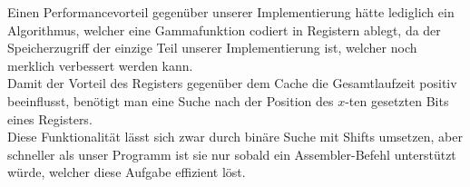 \documentclass[course=erap]{aspdoc}
\begin{document}
	\noindent Einen Performancevorteil gegenüber unserer Implementierung hätte lediglich ein Algorithmus, welcher eine Gammafunktion codiert in Registern ablegt, da der Speicherzugriff der einzige Teil unserer Implementierung ist, welcher noch merklich verbessert werden kann.\\
	Damit der Vorteil des Registers gegenüber dem Cache die Gesamtlaufzeit positiv beeinflusst, benötigt man eine Suche nach der Position des $x$-ten gesetzten Bits eines Registers.\\
	Diese Funktionalität lässt sich zwar durch binäre Suche mit Shifts umsetzen, aber schneller als unser Programm ist sie nur sobald ein Assembler-Befehl unterstützt würde, welcher diese Aufgabe effizient löst.

	
	{}
\end{document}

